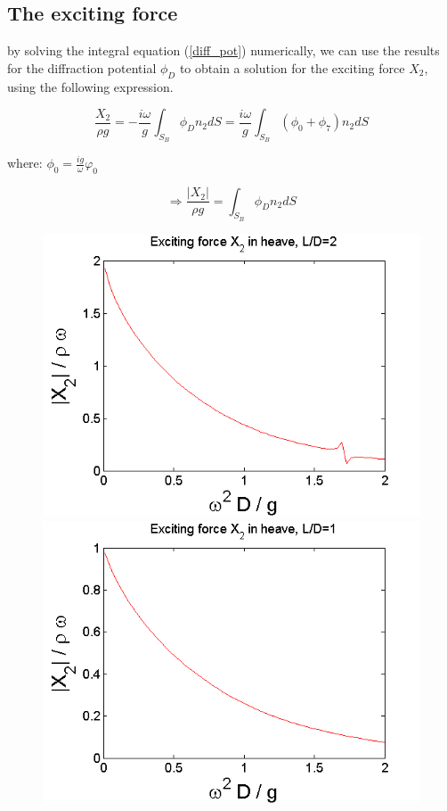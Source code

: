 \documentclass[a4paper,10pt]{article}
\begin{document}
\subsection{The exciting force}
by solving the integral equation (\ref{diff_pot}) numerically, we can use the results for the diffraction potential $\phi_D$ to obtain a solution for the exciting force $X_2$, using the following expression.

$$\frac{X_2}{\rho g} = - \frac{i \omega}{g} \int_{S_B} \phi_D n_2 dS = \frac{i \omega}{g} \int_{S_B} (\phi_0 + \phi_7) n_2 dS$$

where: $\phi_0 = \frac{i g}{\omega} \varphi_0$

$$ \Rightarrow \frac{\vert X_2 \vert}{\rho g} = \int_{S_B} \phi_D n_2 dS $$


\begin{figure}[H]
  \includegraphics[width=\linewidth]{X2_box1.png}
  \caption{}\label{X2_box1}
\endminipage
{}
  \includegraphics[width=\linewidth]{X2_box2.png}

\end{figure}
\end{document}
